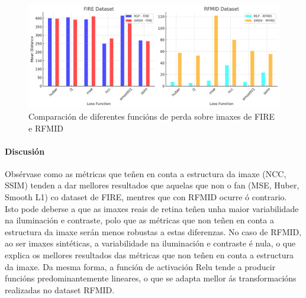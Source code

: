 
\begin{figure}[ht]
    \centering
    \includegraphics[width=1\textwidth]{imaxes/losstype.png}
    \caption{Comparación de diferentes funcións de perda sobre imaxes de FIRE e RFMID}
    \label{fig:loss_functions_comparison}
\end{figure}

\FloatBarrier


\paragraph{Discusión}
\label{par:Discusion-loss}

Obsérvase como as métricas que teñen en conta a estructura da imaxe (NCC, SSIM) tenden a dar mellores resultados que aquelas que non o fan (MSE, Huber, Smooth L1) co dataset de FIRE, mentres que con RFMID ocurre ó contrario.
Isto pode deberse a que as imaxes reais de retina teñen unha maior variabilidade na iluminación e contraste, polo que as métricas que non teñen en conta a estructura da imaxe serán menos robustas a estas diferenzas.
No caso de RFMID, ao ser imaxes sintéticas, a variabilidade na iluminación e contraste é nula, o que explica os mellores resultados das métricas que non teñen en conta a estructura da imaxe.
Da mesma forma, a función de activación Relu tende a producir funcións predominantemente lineares, o que se adapta mellor ás transformacións realizadas no dataset RFMID.


